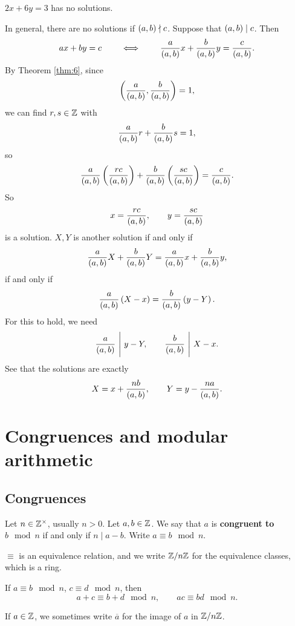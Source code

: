 \begin{example2}
$ 2x + 6y = 3 $ has no solutions.
\end{example2}

In general, there are no solutions if $ \left( a, b \right) \nmid c $. Suppose that $ \left( a, b \right) \mid c $. Then
$$ ax + by = c \qquad \iff \qquad \dfrac{a}{\left( a, b \right)}x + \dfrac{b}{\left( a, b \right)}y = \dfrac{c}{\left( a, b \right)}. $$
By Theorem \ref{thm:6}, since
$$ \left( \dfrac{a}{\left( a, b \right)}, \dfrac{b}{\left( a, b \right)} \right) = 1, $$
we can find $ r, s \in \mathbb{Z} $ with
$$ \dfrac{a}{\left( a, b \right)}r + \dfrac{b}{\left( a, b \right)}s = 1, $$
so
$$ \dfrac{a}{\left( a, b \right)}\left( \dfrac{rc}{\left( a, b \right)} \right) + \dfrac{b}{\left( a, b \right)}\left( \dfrac{sc}{\left( a, b \right)} \right) = \dfrac{c}{\left( a, b \right)}. $$
So
$$ x = \dfrac{rc}{\left( a, b \right)}, \qquad y = \dfrac{sc}{\left( a, b \right)} $$
is a solution.
$ X, Y $ is another solution if and only if
$$ \dfrac{a}{\left( a, b \right)}X + \dfrac{b}{\left( a, b \right)}Y = \dfrac{a}{\left( a, b \right)}x + \dfrac{b}{\left( a, b \right)}y, $$
if and only if
$$ \dfrac{a}{\left( a, b \right)}\left( X - x \right) = \dfrac{b}{\left( a, b \right)}\left( y - Y \right). $$
For this to hold, we need
$$ \dfrac{a}{\left( a, b \right)} \ \Bigg| \ y - Y, \qquad \dfrac{b}{\left( a, b \right)} \ \Bigg| \ X - x. $$
See that the solutions are exactly
$$ X = x + \dfrac{nb}{\left( a, b \right)}, \qquad Y = y - \dfrac{na}{\left( a, b \right)}. $$

\pagebreak

\section{Congruences and modular arithmetic}

\subsection{Congruences}

\begin{definition}
Let $ n \in \mathbb{Z}^\times $, usually $ n > 0 $. Let $ a, b \in \mathbb{Z} $. We say that $ a $ is \textbf{congruent to $ b \mod n $} if and only if $ n \mid a - b $. Write $ a \equiv b \mod n $.
\end{definition}

$ \equiv $ is an equivalence relation, and we write $ \mathbb{Z} / n\mathbb{Z} $ for the equivalence classes, which is a ring.

\begin{example2}
If $ a \equiv b \mod n $, $ c \equiv d \mod n $, then
$$ a + c \equiv b + d \mod n, \qquad ac \equiv bd \mod n. $$
\end{example2}

If $ a \in \mathbb{Z} $, we sometimes write $ \overline{a} $ for the image of $ a $ in $ \mathbb{Z} / n\mathbb{Z} $.

